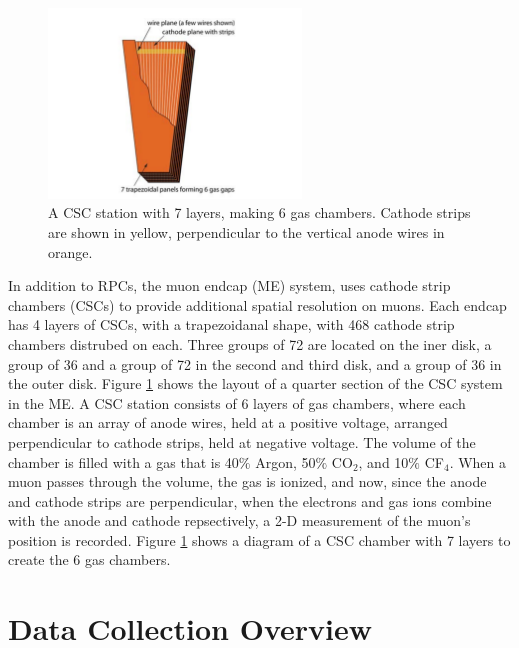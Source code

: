 \begin{figure}[h]
   \centering
  \includegraphics[width=0.6\textwidth]{Figures/CMS_Diagrams/Muon__CSC.pdf}
  \caption{A CSC station with 7 layers, making 6 gas chambers.
    Cathode strips are shown in yellow, perpendicular to the vertical
    anode wires in orange. } \label{fig:muon_csc_layout}
\end{figure}

\par In addition to RPCs, the muon endcap (ME) system, uses cathode
strip chambers (CSCs) to provide additional spatial resolution on
muons.  Each endcap has 4 layers of CSCs, with a trapezoidanal shape,
with 468 cathode strip chambers distrubed on each.  Three groups of 72
are located on the iner disk, a group of 36 and a group of 72 in the
second and third disk, and a group of 36 in the outer disk.  Figure
\ref{fig:muon_csc_layout} shows the layout of a quarter section of the
CSC system in the ME.  A CSC station consists of 6 layers of gas
chambers, where each chamber is an array of anode wires, held at a
positive voltage, arranged perpendicular to cathode strips, held at
negative voltage.  The volume of the chamber is filled with a gas that 
is 40$\%$ Argon, 50$\%$ CO$_{2}$, and 10$\%$ CF$_{4}$.  When a muon
passes through the volume, the gas is ionized, and now, since the
anode and cathode strips are perpendicular, when the electrons and gas
ions combine with the anode and cathode repsectively, a 2-D
measurement of the muon's position is recorded.  Figure
\ref{fig:muon_csc_layout} shows a diagram of a CSC chamber with 7
layers to create the 6 gas chambers.  

\section{Data Collection Overview}
\label{data_collection_description}

